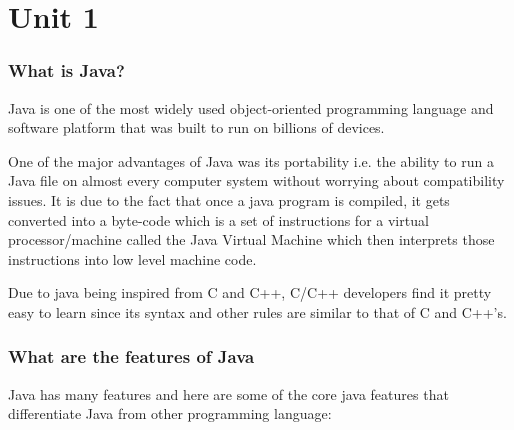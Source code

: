 \documentclass[a4paper, 12pt]{scrarticle}
\begin{document}
\setcounter{tocdepth}{1}
\tableofcontents
\newpage
\part{Unit 1}
\section{What is Java?}
Java is one of the most widely used object-oriented programming language and software platform that was built to run on billions of devices.

One of the major advantages of Java was its portability i.e. the ability to run a Java file on almost every computer system without worrying about compatibility issues. It is due to the fact that once a java program is compiled, it gets converted into a byte-code which is a set of instructions for a
virtual processor/machine called the Java Virtual Machine which then interprets those instructions into low level machine code.

Due to java being inspired from C and C++, C/C++ developers find it pretty easy to learn since its syntax and other rules are similar to that of C and C++'s.


\section{What are the features of Java}
Java has many features and here are some of the core java features that differentiate Java from other programming language:
\end{document}
